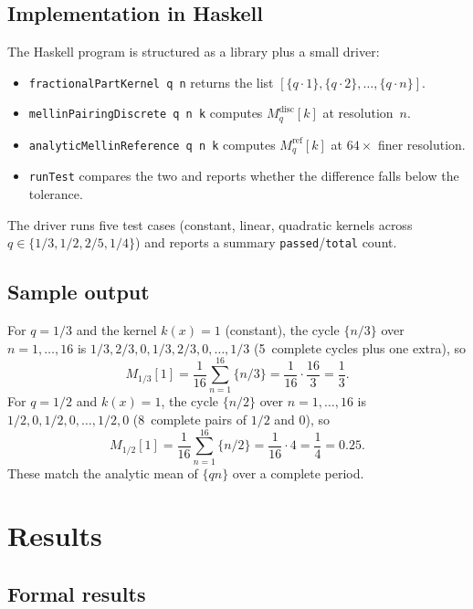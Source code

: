 \documentclass[12pt]{article}
\theoremstyle{plain}
\theoremstyle{definition}
\theoremstyle{remark}
\newcommand{\fracpart}[1]{\{#1\}}
\begin{document}
\subsection{Implementation in Haskell}

The Haskell program is structured as a library plus a small driver:
\begin{itemize}
  \item \texttt{fractionalPartKernel q n} returns the list
    $[\fracpart{q\cdot 1},\fracpart{q\cdot 2},\dots,\fracpart{q\cdot
      n}]$.
  \item \texttt{mellinPairingDiscrete q n k} computes
    $M^{\mathrm{disc}}_q[k]$ at resolution~$n$.
  \item \texttt{analyticMellinReference q n k} computes
    $M^{\mathrm{ref}}_q[k]$ at $64\times$ finer resolution.
  \item \texttt{runTest} compares the two and reports whether the
    difference falls below the tolerance.
\end{itemize}
The driver runs five test cases (constant, linear, quadratic kernels
across $q\in\{1/3, 1/2, 2/5, 1/4\}$) and reports a summary
\texttt{passed}/\texttt{total} count.

\subsection{Sample output}

For $q = 1/3$ and the kernel $k(x) = 1$ (constant), the cycle
$\fracpart{n/3}$ over $n=1,\dots,16$ is
$1/3, 2/3, 0, 1/3, 2/3, 0,\dots,1/3$ (5~complete cycles plus one
extra), so
\[
  M_{1/3}[1] = \frac{1}{16}\sum_{n=1}^{16}\fracpart{n/3}
  = \frac{1}{16}\cdot\frac{16}{3}
  = \frac{1}{3}.
\]
For $q = 1/2$ and $k(x) = 1$, the cycle
$\fracpart{n/2}$ over $n=1,\dots,16$ is
$1/2, 0, 1/2, 0,\dots,1/2, 0$ (8~complete pairs of $1/2$ and $0$), so
\[
  M_{1/2}[1] = \frac{1}{16}\sum_{n=1}^{16}\fracpart{n/2}
  = \frac{1}{16}\cdot 4
  = \frac{1}{4} = 0.25.
\]
These match the analytic mean of $\fracpart{q n}$ over a complete
period.

\section{Results}
\label{sec:results}

\subsection{Formal results}
\end{document}
